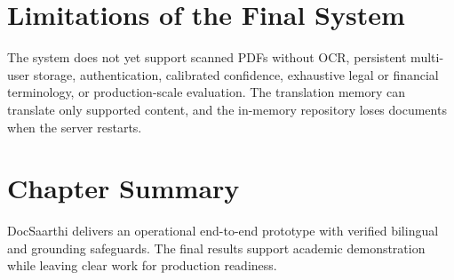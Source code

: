 \section{Limitations of the Final System}
The system does not yet support scanned PDFs without OCR, persistent multi-user storage, authentication, calibrated confidence, exhaustive legal or financial terminology, or production-scale evaluation. The translation memory can translate only supported content, and the in-memory repository loses documents when the server restarts.

\section*{Chapter Summary}
DocSaarthi delivers an operational end-to-end prototype with verified bilingual and grounding safeguards. The final results support academic demonstration while leaving clear work for production readiness.
